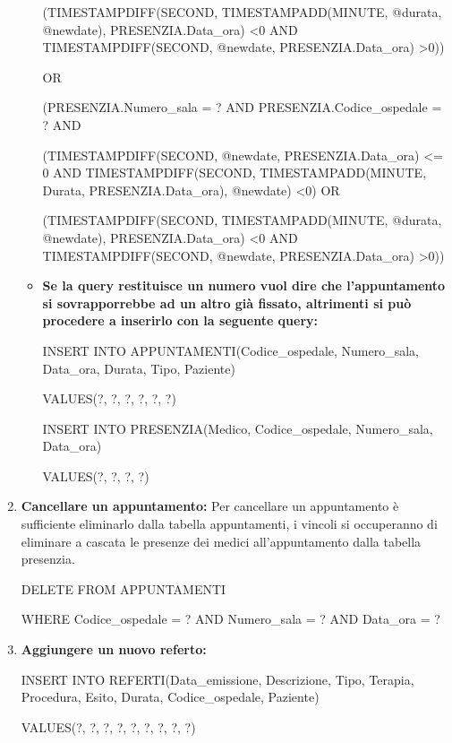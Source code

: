 \documentclass[a4paper,12pt]{report}
\begin{document}
\begin{enumerate}[leftmargin=0cm,itemindent=.5cm,labelwidth=\itemindent,labelsep=0cm,align=left]
\begin{itemize}
            (TIMESTAMPDIFF(SECOND, TIMESTAMPADD(MINUTE, @durata, @newdate), PRESENZIA.Data\_ora) \textless 0 AND TIMESTAMPDIFF(SECOND, @newdate, PRESENZIA.Data\_ora) \textgreater 0))
            
            OR
            
            (PRESENZIA.Numero\_sala = ? AND PRESENZIA.Codice\_ospedale = ? AND
            
            (TIMESTAMPDIFF(SECOND, @newdate, PRESENZIA.Data\_ora) \textless= 0 AND TIMESTAMPDIFF(SECOND, TIMESTAMPADD(MINUTE, Durata, PRESENZIA.Data\_ora), @newdate) \textless 0) OR
            
            (TIMESTAMPDIFF(SECOND, TIMESTAMPADD(MINUTE, @durata, @newdate), PRESENZIA.Data\_ora) \textless 0 AND TIMESTAMPDIFF(SECOND, @newdate, PRESENZIA.Data\_ora) \textgreater 0))

        \item \textbf{Se la query restituisce un numero vuol dire che l'appuntamento si sovrapporrebbe ad un altro già fissato, altrimenti si può procedere a inserirlo 
        con la seguente query:} \newline
        
        INSERT INTO APPUNTAMENTI(Codice\_ospedale, Numero\_sala, Data\_ora, Durata, Tipo, Paziente)
        
        VALUES(?, ?, ?, ?, ?, ?)

        INSERT INTO PRESENZIA(Medico, Codice\_ospedale, Numero\_sala, Data\_ora)
        
        VALUES(?, ?, ?, ?)

    \end{itemize}
    \item \textbf{Cancellare un appuntamento:} Per cancellare un appuntamento è sufficiente eliminarlo dalla tabella appuntamenti, i vincoli si occuperanno di eliminare a cascata
    le presenze dei medici all'appuntamento dalla tabella presenzia.

    DELETE FROM APPUNTAMENTI
    
    WHERE Codice\_ospedale = ? AND Numero\_sala = ? AND Data\_ora = ?

    \item \textbf{Aggiungere un nuovo referto:} \newline
    
    INSERT INTO REFERTI(Data\_emissione, Descrizione, Tipo, Terapia, Procedura, Esito, Durata, Codice\_ospedale, Paziente)
    
    VALUES(?, ?, ?, ?, ?, ?, ?, ?, ?)


\end{enumerate}
\end{document}
